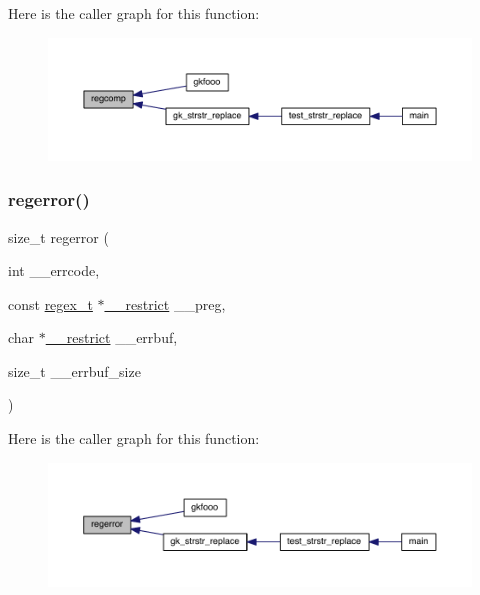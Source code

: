 Here is the caller graph for this function\+:\nopagebreak
\begin{figure}[H]
\begin{center}
\leavevmode
\includegraphics[width=350pt]{a00092_a430f0c9389ac6c08be2286257691317b_icgraph}
\end{center}
\end{figure}
\mbox{\label{a00092_a0284fc25f2802396427939f37caccc1c}} 
\subsubsection{\texorpdfstring{regerror()}{regerror()}}
{\footnotesize\ttfamily size\+\_\+t regerror (\begin{DoxyParamCaption}\item[{int}]{\+\_\+\+\_\+errcode,  }\item[{const \hyperlink{a00092_a159f97bcead74ee31a0817571f7625a9}{regex\+\_\+t} $\ast$\hyperlink{a00092_a4127c12268159bf73f8e69b23c34c610}{\+\_\+\+\_\+restrict}}]{\+\_\+\+\_\+preg,  }\item[{char $\ast$\hyperlink{a00092_a4127c12268159bf73f8e69b23c34c610}{\+\_\+\+\_\+restrict}}]{\+\_\+\+\_\+errbuf,  }\item[{size\+\_\+t}]{\+\_\+\+\_\+errbuf\+\_\+size }\end{DoxyParamCaption})}

Here is the caller graph for this function\+:\nopagebreak
\begin{figure}[H]
\begin{center}
\leavevmode
\includegraphics[width=350pt]{a00092_a0284fc25f2802396427939f37caccc1c_icgraph}
\end{center}
\end{figure}
\mbox{\label{a00092_a179877eb45bb29da01e5101325554d73}} 
